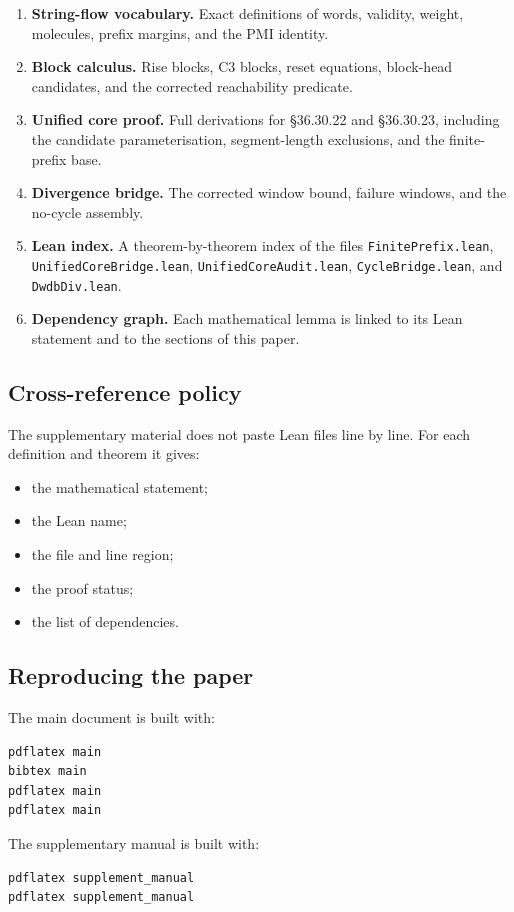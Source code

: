 \begin{enumerate}[leftmargin=*]
\item \textbf{String-flow vocabulary.}  Exact definitions of words,
validity, weight, molecules, prefix margins, and the PMI identity.
\item \textbf{Block calculus.}  Rise blocks, C3 blocks, reset equations,
block-head candidates, and the corrected reachability predicate.
\item \textbf{Unified core proof.}  Full derivations for
\S36.30.22 and \S36.30.23, including the candidate parameterisation,
segment-length exclusions, and the finite-prefix base.
\item \textbf{Divergence bridge.}  The corrected window bound, failure
windows, and the no-cycle assembly.
\item \textbf{Lean index.}  A theorem-by-theorem index of the files
\texttt{FinitePrefix.lean}, \texttt{UnifiedCoreBridge.lean},
\texttt{UnifiedCoreAudit.lean}, \texttt{CycleBridge.lean}, and
\texttt{DwdbDiv.lean}.
\item \textbf{Dependency graph.}  Each mathematical lemma is linked to
its Lean statement and to the sections of this paper.
\end{enumerate}

\subsection{Cross-reference policy}

The supplementary material does not paste Lean files line by line.  For
each definition and theorem it gives:
\begin{itemize}[leftmargin=*]
\item the mathematical statement;
\item the Lean name;
\item the file and line region;
\item the proof status;
\item the list of dependencies.
\end{itemize}

\subsection{Reproducing the paper}

The main document is built with:
\begin{verbatim}
pdflatex main
bibtex main
pdflatex main
pdflatex main
\end{verbatim}
The supplementary manual is built with:
\begin{verbatim}
pdflatex supplement_manual
pdflatex supplement_manual
\end{verbatim}

